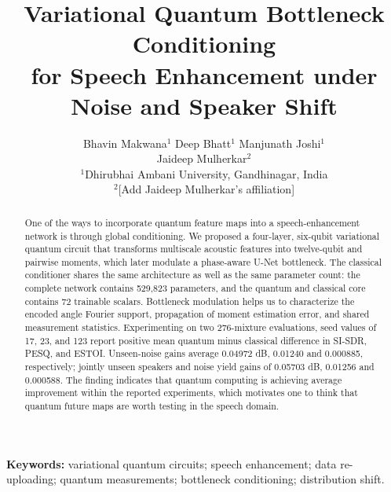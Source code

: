 \documentclass[10pt,a4paper]{article}
\title{Variational Quantum Bottleneck Conditioning\\for Speech Enhancement under Noise and Speaker Shift}
\author{
Bhavin Makwana$^{1}$ \quad Deep Bhatt$^{1}$ \quad Manjunath Joshi$^{1}$\\[4pt]
Jaideep Mulherkar$^{2}$\\[6pt]
\small $^{1}$Dhirubhai Ambani University, Gandhinagar, India\\
\small $^{2}$[Add Jaideep Mulherkar's affiliation]
}
\date{}
\begin{document}
\maketitle
\begin{abstract}


One of the ways to incorporate quantum feature maps into a speech-enhancement network is through global conditioning. We proposed a four-layer, six-qubit variational quantum circuit that transforms multiscale acoustic features into twelve-qubit and pairwise moments, which later modulate a phase-aware U-Net bottleneck. The classical conditioner shares the same architecture as well as the same parameter count: the complete network contains 529,823 parameters, and the quantum and classical core contains 72 trainable scalars. Bottleneck modulation helps us to characterize the encoded angle Fourier support, propagation of moment estimation error, and shared measurement statistics. Experimenting on two 276-mixture evaluations, seed values of 17, 23, and 123 report positive mean quantum minus classical difference in SI-SDR, PESQ, and ESTOI. Unseen-noise gains average 0.04972 dB, 0.01240 and 0.000885, respectively; jointly unseen speakers and noise yield gains of 0.05703 dB, 0.01256 and 0.000588. The finding indicates that quantum computing is achieving average improvement within the reported experiments, which motivates one to think that quantum future maps are worth testing in the speech domain.




\end{abstract}
\noindent\textbf{Keywords:} variational quantum circuits; speech enhancement; data re-uploading; quantum measurements; bottleneck conditioning; distribution shift.
\end{document}
